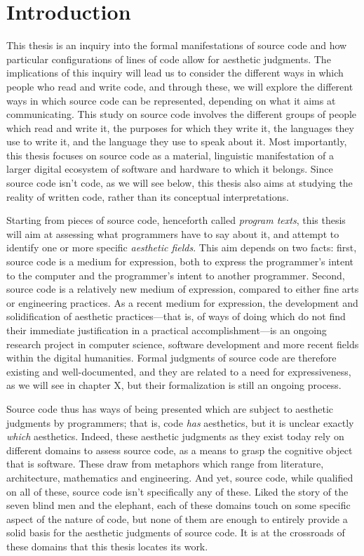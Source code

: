 \section{Introduction}

This thesis is an inquiry into the formal manifestations of source code and how particular configurations of lines of code allow for aesthetic judgments. The implications of this inquiry will lead us to consider the different ways in which people who read and write code, and through these, we will explore the different ways in which source code can be represented, depending on what it aims at communicating.
This study on source code involves the different groups of people which read and write it, the purposes for which they write it, the languages they use to write it, and the language they use to speak about it. Most importantly, this thesis focuses on source code as a material, linguistic manifestation of a larger digital ecosystem of software and hardware to which it belongs. Since source code isn't code, as we will see below, this thesis also aims at studying the reality of written code, rather than its conceptual interpretations.

Starting from pieces of source code, henceforth called \emph{program texts}\cite{detienne_software_2012}, this thesis will aim at assessing what programmers have to say about it, and attempt to identify one or more specific \emph{aesthetic fields}. This aim depends on two facts: first, source code is a medium for expression, both to express the programmer's intent to the computer\cite{dijkstra_chapter_1972} and the programmer's intent to another programmer\cite{abelson_structure_1979}. Second, source code is a relatively new medium of expression, compared to either fine arts or engineering practices. As a recent medium for expression, the development and solidification of aesthetic practices—that is, of ways of doing which do not find their immediate justification in a practical accomplishment—is an ongoing research project in computer science, software development and more recent fields within the digital humanities. Formal judgments of source code are therefore existing and well-documented, and they are related to a need for expressiveness, as we will see in chapter X, but their formalization is still an ongoing process.

Source code thus has ways of being presented which are subject to aesthetic judgments by programmers; that is, code \emph{has} aesthetics, but it is unclear exactly \emph{which} aesthetics. Indeed, these aesthetic judgments as they exist today rely on different domains to assess source code, as a means to grasp the cognitive object that is software. These draw from metaphors which range from literature, architecture, mathematics and engineering. And yet, source code, while qualified on all of these, source code isn't specifically any of these. Liked the story of the seven blind men and the elephant\cite{chun_sourcery_2008}, each of these domains touch on some specific aspect of the nature of code, but none of them are enough to entirely provide a solid basis for the aesthetic judgments of source code. It is at the crossroads of these domains that this thesis locates its work.

